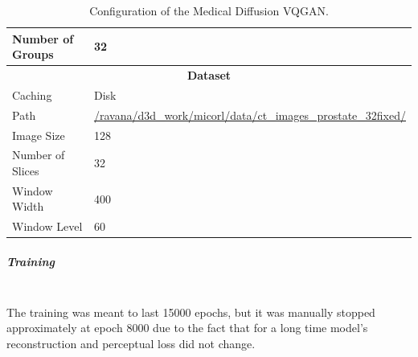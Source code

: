 \begin{table}[H]
\begin{tabular}{|l|l|}
\hline
Number of Groups & 32 \\
\hline
\multicolumn{2}{|c|}{\textbf{Dataset}} \\
\hline
Caching & Disk \\
\hline
Path & \url{/ravana/d3d\_work/micorl/data/ct\_images\_prostate\_32fixed/} \\
\hline
Image Size & 128 \\
\hline
Number of Slices & 32 \\
\hline
Window Width & 400 \\
\hline
Window Level & 60 \\
\hline
\end{tabular}
\caption{Configuration of the Medical Diffusion VQGAN.}
\label{table:meta_vqgan_params}
\end{table}

\subparagraph{Training}\mbox{}\\

The training was meant to last 15000 epochs, but it was manually stopped approximately at epoch 8000 due to the fact that for a long time model's reconstruction and perceptual loss did not change.

